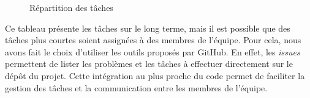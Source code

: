 \begin{figure}[H]
\begin{tabular}{|c|c|c|c|}
    \end{tabular}
    \caption{R\'epartition des tâches}
    \label{fig:repartition_des_taches}
\end{figure}


Ce tableau présente les tâches sur le long terme, mais il est possible que des tâches plus courtes soient assignées à des membres de l'équipe.
Pour cela, nous avons fait le choix d'utiliser les outils proposés par GitHub.
En effet, les \textit{issues} permettent de lister les problèmes et les tâches à effectuer directement sur le dépôt du projet.
Cette intégration au plus proche du code permet de faciliter la gestion des tâches et la communication entre les membres de l'équipe.
\\








    








